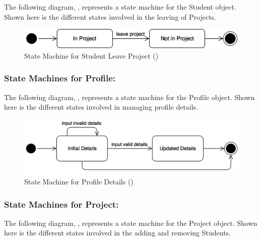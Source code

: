 \documentclass[12pt,letterpaper]{article}
\begin{document}
\noindent The following diagram, , represents a state machine for the Student object. Shown here is the different states involved in the leaving of Projects.

\begin{figure}[H]
	\centering{}
	\includegraphics[scale=0.3]{imgs/state/student-leave-project.png}
	\caption[ - State Machine for Student Leave Project]{State Machine for Student Leave Project ()}
\end{figure}

\newpage{}

\subsubsection*{State Machines for Profile:}

The following diagram, , represents a state machine for the Profile object. Shown here is the different states involved in managing profile details.

\begin{figure}[H]
	\centering{}
	\includegraphics[scale=0.3]{imgs/state/profile-details.png}
	\caption[ - State Machine for Profile Details]{State Machine for Profile Details ()}
\end{figure}

\subsubsection*{State Machines for Project:}

The following diagram, , represents a state machine for the Project object. Shown here is the different states involved in the adding and removing Students.
\end{document}
